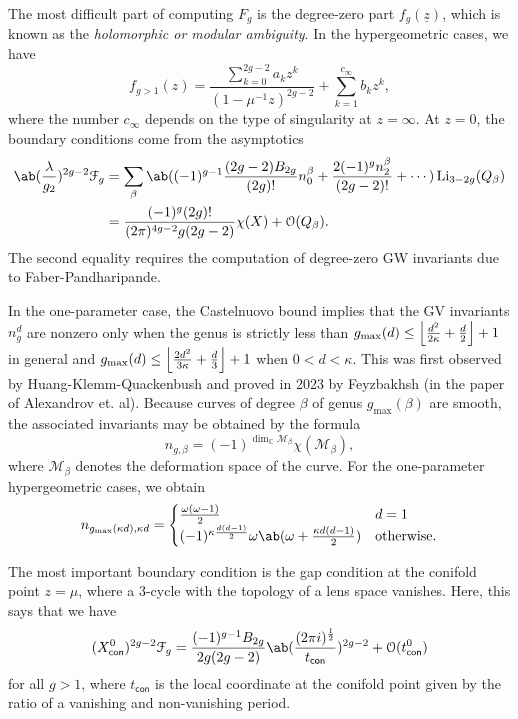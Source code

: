 \documentclass[10pt]{amsart}
\DeclarePairedDelimiter{\floor}{\lfloor}{\rfloor}
\theoremstyle{definition}
\theoremstyle{remark}
\theoremstyle{plain}
\theoremstyle{definition}
\theoremstyle{remark}
\newcommand{\C}{\mathbb{C}}
\newcommand{\M}{\mathcal{M}}
\newcommand{\mc}[1]{\mathcal{#1}}
\newcommand{\uz}{\ul{z}}
\newcommand{\on}[1]{\operatorname{#1}}
\newcommand{\ms}[1]{\mathsf{#1}}
\newcommand{\ul}[1]{\underline{#1}}
\newcommand{\1}{\mathbf{1}}
\newcommand{\2}{\mathbf{2}}
\newcommand{\3}{\mathbf{3}}
\begin{document}
The most difficult part of computing $F_g$ is the degree-zero part $f_g(\uz)$, which is known as the \textit{holomorphic or modular ambiguity}. In the hypergeometric cases, we have
\[ f_{g>1}(z) = \frac{\sum_{k=0}^{2g-2} a_k z^k}{( 1-\mu^{-1}z )^{2g-2}} + \sum_{k=1}^{c_{\infty}} b_k z^k, \]
where the number $c_{\infty}$ depends on the type of singularity at $z=\infty$. At $z=0$, the boundary conditions come from the asymptotics
\begin{align*}
    \ab(\frac{\lambda}{g_2})^{2g-2} \mc{F}_g &= \sum_{\beta} \ab((-1)^{g-1} \frac{(2g-2)B_{2g}}{(2g)!}n_0^{\beta} + \frac{2(-1)^g n_2^{\beta}}{(2g-2)!} + \cdots) \on{Li}_{3-2g}(Q_{\beta}) \\
    &= \frac{(-1)^g (2g)!}{(2\pi)^{4g-2}g(2g-2)}\chi(X) + \mc{O}(Q_{\beta}).
\end{align*}
The second equality requires the computation of degree-zero GW invariants due to Faber-Pandharipande.

In the one-parameter case, the Castelnuovo bound implies that the GV invariants $n_g^d$ are nonzero only when the genus is strictly less than $g_{\max}(d) \leq \floor*{\frac{d^2}{2\kappa}+\frac{d}{2}}+1$ in general and $g_{\max}(d) \leq \floor*{\frac{2d^2}{3\kappa} + \frac{d}{3}}+1$ when $0 < d < \kappa$. This was first observed by Huang-Klemm-Quackenbush and proved in 2023 by Feyzbakhsh (in the paper of Alexandrov et. al). Because curves of degree $\beta$ of genus $g_{\max}(\beta)$ are smooth, the associated invariants may be obtained by the formula
\[ n_{g,\beta} = (-1)^{\dim_{\C} \M_{\beta}} \chi(\M_{\beta}), \]
where $\M_{\beta}$ denotes the deformation space of the curve. For the one-parameter hypergeometric cases, we obtain
\[ n_{g_{\max}(\kappa d),\kappa d} = \begin{cases}
    \frac{\omega(\omega-1)}{2} & d=1 \\
    (-1)^{\kappa \frac{d(d-1)}{2}} \omega \ab(\omega + \frac{\kappa d(d-1)}{2}) & \text{otherwise}.
\end{cases}
\]

The most important boundary condition is the gap condition at the conifold point $z=\mu$, where a $3$-cycle with the topology of a lens space vanishes. Here, this says that we have
\[ (X^0_{\ms{con}})^{2g-2}\mc{F}_g = \frac{(-1)^{g-1}B_{2g}}{2g(2g-2)} \ab(\frac{(2\pi i)^{\frac{1}{2}}}{t_{\ms{con}}})^{2g-2} + \mc{O}(t_{\ms{con}}^0) \]
for all $g > 1$, where $t_{\ms{con}}$ is the local coordinate at the conifold point given by the ratio of a vanishing and non-vanishing period.
\end{document}
